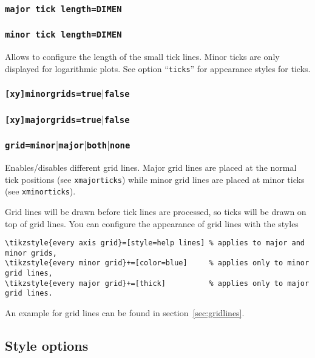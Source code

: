 \subsubsection{\texttt{major tick length=DIMEN}}
\subsubsection{\texttt{minor tick length=DIMEN}}
Allows to configure the length of the small tick lines. Minor ticks are only displayed for logarithmic plots. See option ``\texttt{ticks}'' for appearance styles for ticks.

\subsubsection{\texttt{[xy]minorgrids=true$|$false}}
\subsubsection{\texttt{[xy]majorgrids=true$|$false}}
\subsubsection{\texttt{grid=minor$|$major$|$both$|$none}}
Enables/disables different grid lines. Major grid lines are placed at the normal tick positions (see \texttt{xmajorticks}) while minor grid lines are placed at minor ticks (see \texttt{xminorticks}). 

Grid lines will be drawn before tick lines are processed, so ticks will be drawn on top of grid lines. You can configure the appearance of grid lines with the styles
\begin{lstlisting}
\tikzstyle{every axis grid}=[style=help lines] % applies to major and minor grids,
\tikzstyle{every minor grid}+=[color=blue]     % applies only to minor grid lines,
\tikzstyle{every major grid}+=[thick]          % applies only to major grid lines.
\end{lstlisting}
An example for grid lines can be found in section~\ref{sec:gridlines}.






\subsection{Style options}

